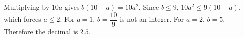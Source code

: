 Multiplying by $10a$ gives $b(10-a)=10a^2$. Since $b\le9$, $10a^2\le9(10-a)$, which forces $a\le2$. For $a=1$, $b=\dfrac{10}{9}$ is not an integer. For $a=2$, $b=5$. Therefore the decimal is $\boxed{2.5}$.

